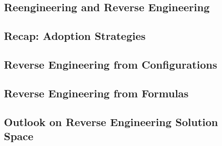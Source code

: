 \subsection{Reengineering and Reverse Engineering}
\subsection{Recap: Adoption Strategies}
\subsection{Reverse Engineering from Configurations}
\subsection{Reverse Engineering from Formulas}
\subsection{Outlook on Reverse Engineering Solution Space}



